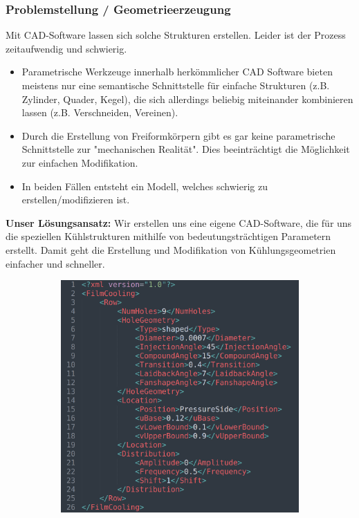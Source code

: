 \documentclass[8pt, aspectratio=169]{beamer}
\begin{document}
\begin{frame}
	\frametitle{Problemstellung / Geometrieerzeugung}
	\vspace{-0.5cm}\hspace{-0.5cm}
	\begin{minipage}[t]{0.65\textwidth}
		\vspace{0.2cm}
		Mit CAD-Software lassen sich solche Strukturen erstellen. Leider ist der Prozess zeitaufwendig und schwierig.
		\begin{itemize}
			\item Parametrische Werkzeuge innerhalb herkömmlicher CAD Software bieten meistens nur eine semantische Schnittstelle für einfache Strukturen (z.B. Zylinder, Quader, Kegel), die sich allerdings beliebig miteinander kombinieren lassen (z.B. Verschneiden, Vereinen).
			\item Durch die Erstellung von Freiformkörpern gibt es gar keine parametrische Schnittstelle zur "mechanischen Realität". Dies beeinträchtigt die Möglichkeit zur einfachen Modifikation.
			\item[\textrightarrow] In beiden Fällen entsteht ein Modell, welches schwierig zu erstellen/modifizieren ist.
		\end{itemize}
		\vspace{1em}
		\textbf{Unser Lösungsansatz:} Wir erstellen uns eine eigene CAD-Software, die für uns die speziellen Kühlstrukturen mithilfe von bedeutungsträchtigen Parametern erstellt. Damit geht die Erstellung und Modifikation von Kühlungsgeometrien einfacher und schneller.
	\end{minipage}
	\begin{minipage}[t]{0.35\textwidth}
		\begin{figure}[H]
			\centering
			\begin{subfigure}{0.8\textwidth}
				\centering
				\includegraphics[width=\textwidth]{images/filmxml.png}

\end{subfigure}
\end{figure}
\end{minipage}
\end{frame}
\end{document}
